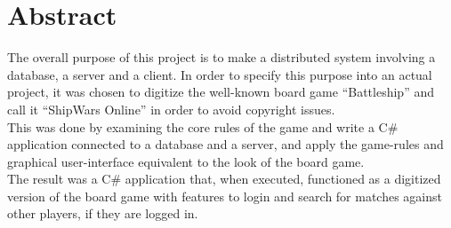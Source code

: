 
\chapter{Abstract}

The overall purpose of this project is to make a distributed system involving
 a database, a server and a client. In order to specify this purpose into an
  actual project, it was chosen to digitize the well-known board game
   “Battleship” and call it “ShipWars Online” in order to avoid copyright
    issues. \\
This was done by examining the core rules of the game and write
 a C{\#} application connected to a database and a server, and apply
  the game-rules and graphical user-interface equivalent to the look
   of the board game.\\
The result was a C{\#} application that, when executed, functioned as
 a digitized version of the board game with features to login and search
  for matches against other players, if they are logged in.
